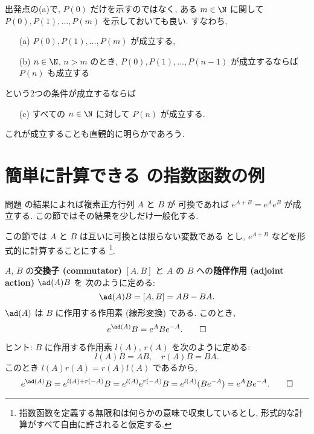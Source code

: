 \documentclass[12pt,twoside]{jarticle}
\begin{document}
出発点の(a)で, $P(0)$ だけを示すのではなく, 
ある $m\in\N$ に関して $P(0),P(1),\dots,P(m)$ を示しておいても良い. 
すなわち, 
\begin{itemize}
\item[(a)] $P(0),P(1),\ldots,P(m)$ が成立する,
\item[(b)] $n\in\N$, $n>m$ のとき, 
  $P(0),P(1),\ldots,P(n-1)$ が成立するならば $P(n)$ も成立する
\end{itemize}
という2つの条件が成立するならば
\begin{itemize}
\item[(c)] すべての $n\in\N$ に対して $P(n)$ が成立する.
\end{itemize}
これが成立することも直観的に明らかであろう.


\section{簡単に計算できる  の指数函数の例}
\label{sec:exp(A+B)}

問題  の結果によれば複素正方行列 $A$ と $B$ が
可換であれば $e^{A+B}=e^A e^B$ が成立する.  
この節ではその結果を少しだけ一般化する.

この節では $A$ と $B$ は互いに可換とは限らない変数である
とし, $e^{A+B}$ などを形式的に計算することにする%
\footnote{指数函数を定義する無限和は何らかの意味で収束しているとし, 
  形式的な計算がすべて自由に許されると仮定する.}.

\begin{question}
  $A$, $B$ の{\bf 交換子 (commutator)} $[A,B]$ 
  と $A$ の $B$ への{\bf 随伴作用 (adjoint action)} $\ad(A)B$ を
  次のように定める:
  \begin{equation*}
    \ad(A)B = [A,B] = AB - BA.
  \end{equation*}
  $\ad(A)$ は $B$ に作用する作用素 (線形変換) である. このとき, 
  \begin{equation*}
    e^{\ad(A)}B = e^A B e^{-A}. \qed
  \end{equation*}
\end{question}

\noindent 
ヒント: $B$ に作用する作用素 $l(A)$, $r(A)$ を次のように定める:
\begin{equation*}
  l(A)B = AB, \quad r(A)B = BA.
\end{equation*}
このとき $l(A)r(A) = r(A)l(A)$ であるから, 
\begin{equation*}
  e^{\ad(A)}B
  = e^{l(A)+r(-A)}B
  = e^{l(A)}e^{r(-A)}B
  = e^{l(A)}(Be^{-A})
  = e^A B e^{-A}.
  \qed
\end{equation*}
\end{document}
